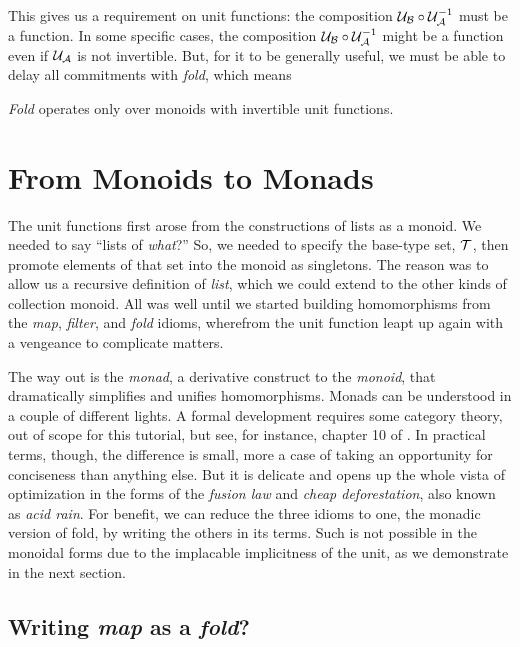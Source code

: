 This gives us a requirement on unit functions: the composition $\mathcal{U}_{\mathcal{B}}\circ{\mathcal{U}}^{-1}_{\mathcal{A}}$ must be a function. In some specific cases, the composition $\mathcal{U}_{\mathcal{B}}\circ{\mathcal{U}}^{-1}_{\mathcal{A}}$ might be a function even if $\mathcal{U}_{\mathcal{A}}$ is not invertible. But, for it to be generally useful, we must be able to delay all commitments with \emph{fold}, which means


\begin{observation}
  \emph{Fold} operates only over monoids with invertible unit functions. 
\end{observation}


\section{\color{Red}From Monoids to Monads}


The unit functions first arose from the constructions of lists as a monoid. We needed to say ``lists of \emph{what}?'' So, we needed to specify the base-type set, $\mathcal{T}$, then promote elements of that set into the monoid as singletons. The reason was to allow us a recursive definition of \emph{list}, which we could extend to the other kinds of collection monoid. All was well until we started building homomorphisms from the \emph{map}, \emph{filter}, and \emph{fold} idioms, wherefrom the unit function leapt up again with a vengeance to complicate matters. 


The way out is the \emph{monad}, a derivative construct to the \emph{monoid}, that dramatically simplifies and unifies homomorphisms. Monads can be understood in a couple of different lights. A formal development requires some category theory, out of scope for this tutorial, but see, for instance, chapter 10 of \cite{arrows}. In practical terms, though, the difference is small, more a case of taking an opportunity for conciseness than anything else. But it is delicate and opens up the whole vista of optimization in the forms of the \emph{fusion law} and \emph{cheap deforestation}, also known as \emph{acid rain}. For benefit, we can reduce the three idioms to one, the monadic version of fold, by writing the others in its terms. Such is not possible in the monoidal forms due to the implacable implicitness of the unit, as we demonstrate in the next section.


\subsection{\color{red}Writing \emph{map} as a \emph{fold}?}


